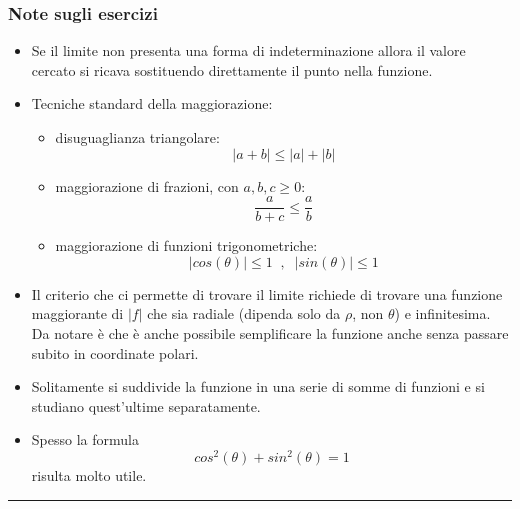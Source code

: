 \subsubsection*{Note sugli esercizi}
\begin{itemize}
    \item Se il limite non presenta una forma di indeterminazione allora il valore cercato si ricava sostituendo direttamente il punto nella funzione.
    \item Tecniche standard della maggiorazione: 
        \begin{itemize}
            \item disuguaglianza triangolare:
                \[
                    |a+b| \leq |a| + |b|
                \]
            \item maggiorazione di frazioni, con $a,b,c \geq 0$:
                \[
                    \frac{a}{b+c} \leq \frac{a}{b}
                \]
            \item maggiorazione di funzioni trigonometriche:
                \[
                    |cos(\theta)| \leq 1 \;\;,\;\;|sin(\theta)|\leq 1
                \]
        \end{itemize}
    \item Il criterio che ci permette di trovare il limite richiede di trovare una funzione maggiorante di $|f|$ che sia radiale (dipenda solo da $\rho$, non $\theta$) e infinitesima. Da notare è che è anche possibile semplificare la funzione anche senza passare subito in coordinate polari.
    \item Solitamente si suddivide la funzione in una serie di somme di funzioni e si studiano quest'ultime separatamente.
    \item Spesso la formula
        \[
            cos^2(\theta) + sin^2(\theta) = 1
        \]
        risulta molto utile.
\end{itemize}
\rule{\textwidth}{2pt}

